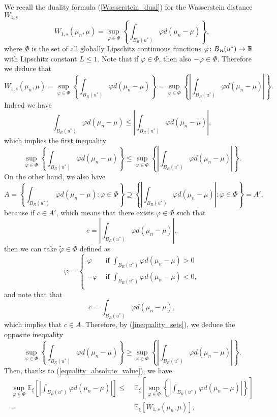 We recall the duality formula (\ref{Wasserstein_dual}) for the Wasserstein distance $W_{1,s}$
\[ W_{1,s}(\mu_n, \mu) = \sup_{\varphi \in \Phi} \left \{ \int_{B_R(u^*)} \varphi d(\mu_n - \mu) \right \}, \]
where $\Phi$ is the set of all globally Lipschitz continuous functions $\varphi \colon B_R(u^*) \to \mathbb{R}$ with Lipschitz constant $L \le 1$. Note that if $\varphi \in \Phi$, then also $- \varphi \in \Phi$.
Therefore we deduce that
\begin{equation}
\label{equality_absolute_value}
W_{1,s}(\mu_n, \mu) = \sup_{\varphi \in \Phi} \left \{ \int_{B_R(u^*)} \varphi d(\mu_n - \mu) \right \} = \sup_{\varphi \in \Phi} \left \{ \left | \int_{B_R(u^*)} \varphi d(\mu_n - \mu) \right | \right \}.
\end{equation}
Indeed we have
\[ \int_{B_R(u^*)} \varphi d(\mu_n - \mu) \le \left | \int_{B_R(u^*)} \varphi d(\mu_n - \mu) \right |, \]
which implies the first inequality
\[ \sup_{\varphi \in \Phi} \left \{ \int_{B_R(u^*)} \varphi d(\mu_n - \mu) \right \} \le \sup_{\varphi \in \Phi} \left \{ \left | \int_{B_R(u^*)} \varphi d(\mu_n - \mu) \right | \right \}. \]
On the other hand, we also have
\begin{equation}
\label{inequality_sets}
A = \left \{ \int_{B_R(u^*)} \varphi d(\mu_n - \mu) \colon \varphi \in \Phi \right \} \supseteq \left \{ \left | \int_{B_R(u^*)} \varphi d(\mu_n - \mu) \right | \colon \varphi \in \Phi \right \} = A',
\end{equation}
because if $c \in A'$, which means that there exists $\varphi \in \Phi$ such that
\[ c = \left | \int_{B_R(u^*)} \varphi d(\mu_n - \mu) \right |, \]
then we can take $\tilde{\varphi} \in \Phi$ defined as
\begin{equation*}
\tilde{\varphi} = 
\begin{cases}
\varphi & \text{ if } \int_{B_R(u^*)} \varphi d(\mu_n - \mu) > 0 \\
- \varphi & \text{ if } \int_{B_R(u^*)} \varphi d(\mu_n - \mu) < 0, \\
\end{cases}
\end{equation*}
and note that that 
\[ c = \int_{B_R(u^*)} \tilde{\varphi} d(\mu_n - \mu), \]
which implies that $c \in A$. Therefore, by (\ref{inequality_sets}), we deduce the opposite inequality
\[ \sup_{\varphi \in \Phi} \left \{ \int_{B_R(u^*)} \varphi d(\mu_n - \mu) \right \} \ge \sup_{\varphi \in \Phi} \left \{ \left | \int_{B_R(u^*)} \varphi d(\mu_n - \mu) \right | \right \}. \]
Then, thanks to (\ref{equality_absolute_value}), we have
\begin{align*}
\sup_{\varphi \in \Phi} \mathbb{E}_{\xi} \left [ \left | \int_{B_R(u^*)} \varphi d(\mu_n - \mu) \right | \right ] \le & \; \mathbb{E}_{\xi} \left [ \sup_{\varphi \in \Phi} \left \{ \left | \int_{B_R(u^*)} \varphi d(\mu_n - \mu) \right | \right \} \right ] \\
= & \; \mathbb{E}_{\xi} [ W_{1,s}(\mu_n, \mu) ],
\end{align*}

